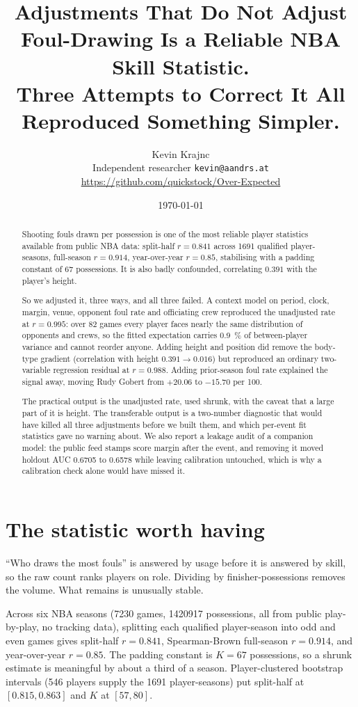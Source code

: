 \documentclass[10pt,letterpaper]{article}
\title{\vspace{-1.2cm}\bfseries Adjustments That Do Not Adjust\\[2pt]
\large Foul-Drawing Is a Reliable NBA Skill Statistic.\\
Three Attempts to Correct It All Reproduced Something Simpler.}
\author{Kevin Krajnc\\
\small Independent researcher \quad\textbar\quad \texttt{kevin@aandrs.at}\\
\small \url{https://github.com/quickstock/Over-Expected}}
\date{\vspace{-3mm}\small\today}
\begin{document}
\maketitle
\vspace{-6mm}

\begin{abstract}
\noindent\small
Shooting fouls drawn per possession is one of the most reliable player
statistics available from public NBA data: split-half $r = 0.841$ across
\num{1691} qualified player-seasons, full-season $r = 0.914$, year-over-year
$r = 0.85$, stabilising with a padding constant of 67 possessions. It is also
badly confounded, correlating $0.391$ with the player's height.

So we adjusted it, three ways, and all three failed. A context model on period,
clock, margin, venue, opponent foul rate and officiating crew reproduced the
unadjusted rate at $r = 0.995$: over 82 games every player faces nearly the same
distribution of opponents and crews, so the fitted expectation carries
\SI{0.9}{\percent} of between-player variance and cannot reorder anyone. Adding
height and position did remove the body-type gradient (correlation with height
$0.391 \to 0.016$) but reproduced an ordinary two-variable regression residual at
$r = 0.988$. Adding prior-season foul rate explained the signal away, moving Rudy
Gobert from $+20.06$ to $-15.70$ per 100.

The practical output is the unadjusted rate, used shrunk, with the caveat that a
large part of it is height. The transferable output is a two-number diagnostic
that would have killed all three adjustments before we built them, and which
per-event fit statistics gave no warning about. We also report a leakage audit of
a companion model: the public feed stamps score margin after the event, and
removing it moved holdout AUC 0.6705 to 0.6578 while leaving calibration
untouched, which is why a calibration check alone would have missed it.
\end{abstract}

\section{The statistic worth having}

``Who draws the most fouls'' is answered by usage before it is answered by skill,
so the raw count ranks players on role. Dividing by finisher-possessions removes
the volume. What remains is unusually stable.

Across six NBA seasons (\num{7230} games, \num{1420917} possessions, all from
public play-by-play, no tracking data), splitting each qualified player-season
into odd and even games gives split-half $r = 0.841$, Spearman-Brown full-season
$r = 0.914$, and year-over-year $r = 0.85$. The padding constant is
$K = 67$ possessions, so a shrunk estimate is meaningful by about a third of a
season. Player-clustered bootstrap intervals (546 players supply the \num{1691}
player-seasons) put split-half at $[0.815, 0.863]$ and $K$ at $[57, 80]$.
\end{document}
